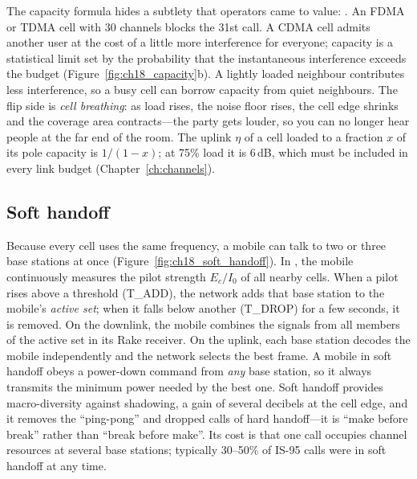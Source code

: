 The capacity formula hides a subtlety that operators came to value: .
An FDMA or TDMA cell with 30 channels blocks the 31st call. A CDMA cell admits another user
at the cost of a little more interference for everyone; capacity is a statistical limit set
by the probability that the instantaneous interference exceeds the budget
(Figure~\ref{fig:ch18_capacity}b). A lightly loaded neighbour contributes less interference,
so a busy cell can borrow capacity from quiet neighbours. The flip side is \emph{cell
breathing}: as load rises, the noise floor rises, the cell edge shrinks and the coverage
area contracts---the party gets louder, so you can no longer hear people at the far end of the
room. The uplink  $\eta$ of a cell loaded to a fraction $x$ of its
pole capacity is $1/(1-x)$; at 75\% load it is 6\,dB, which must be included in every link
budget (Chapter~\ref{ch:channels}).

\subsection{Soft handoff}

Because every cell uses the same frequency, a mobile can talk to two or three base stations
at once (Figure~\ref{fig:ch18_soft_handoff}). In , the mobile continuously measures the pilot strength $E_c/I_0$
of all nearby cells. When a pilot rises above a threshold (T\_ADD), the network adds that
base station to the mobile's \emph{active set}; when it falls below another (T\_DROP) for
a few seconds, it is removed. On the downlink, the mobile combines the signals from all
members of the active set in its Rake receiver. On the uplink, each base station decodes the
mobile independently and the network selects the best frame. A mobile in soft handoff
obeys a power-down command from \emph{any} base station, so it always transmits the minimum
power needed by the best one. Soft handoff provides macro-diversity against shadowing, a gain
of several decibels at the cell edge, and it removes the ``ping-pong'' and dropped calls of
hard handoff---it is ``make before break'' rather than ``break before make''. Its cost is that
one call occupies channel resources at several base stations; typically 30--50\% of IS-95 calls
were in soft handoff at any time.

